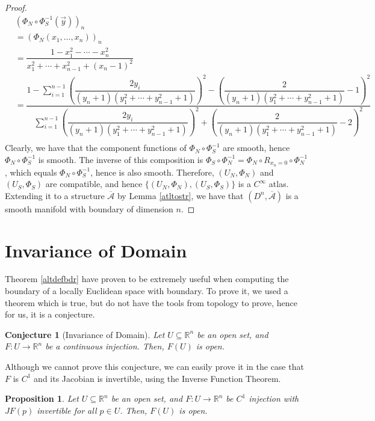 \documentclass{article}
\newcommand{\R}{\mathbb{R}}
\newcommand{\cl}[1]{\overline{#1}}
\newcommand{\atl}[1]{\mathcal{#1}}
\newcommand{\str}[1]{\cl{\atl{#1}}}
\theoremstyle{plain} %
\numberwithin{thm}{section} %
\newtheorem{prop}[thm]{Proposition}
\newtheorem{conj}[thm]{Conjecture}
\theoremstyle{definition} %
\begin{document}
\begin{proof}
\begin{align*}
    &(\Phi_N \circ \Phi_S^{-1}(\vec{y}))_n \\
    &= (\Phi_N(x_1, \dots, x_n))_n \\
    &= \dfrac{1 - x_1^2 - \cdots - x_n^2}{x_1^2 + \cdots + x_{n - 1}^2 + (x_n - 1)^2} \\
    &= \dfrac{1 - \displaystyle\sum_{i = 1}^{n - 1}\left(\dfrac{2y_i}{(y_n + 1)(y_1^2 + \cdots + y_{n - 1}^2 + 1)}\right)^2 - \left(\dfrac{2}{(y_n + 1)(y_1^2 + \cdots + y_{n - 1}^2 + 1)} - 1\right)^2}{\displaystyle\sum_{i = 1}^{n - 1}\left(\dfrac{2y_i}{(y_n + 1)(y_1^2 + \cdots + y_{n - 1}^2 + 1)}\right)^2 + \left(\dfrac{2}{(y_n + 1)(y_1^2 + \cdots + y_{n - 1}^2 + 1)} - 2\right)^2} \\
\end{align*}
Clearly, we have that the component functions of $\Phi_N \circ \Phi_S^{-1}$ are smooth, hence $\Phi_N \circ \Phi_S^{-1}$ is smooth. The inverse of this composition is $\Phi_S \circ \Phi_N^{-1} = \Phi_N \circ R_{x_n = 0} \circ \Phi_N^{-1}$, which equals $\Phi_N \circ \Phi_S^{-1}$, hence is also smooth. Therefore, $(U_N, \Phi_N)$ and $(U_S, \Phi_S)$ are compatible, and hence $\{(U_N, \Phi_N), (U_S, \Phi_S)\}$ is a $C^\infty$ atlas. Extending it to a structure $\str{A}$ by Lemma \ref{atltostr}, we have that $(D^n, \str{A})$ is a smooth manifold with boundary of dimension $n$.
\end{proof}

\appendix

\section{Invariance of Domain}

Theorem \ref{altdefbdr} have proven to be extremely useful when computing the boundary of a locally Euclidean space with boundary. To prove it, we used a theorem which is true, but do not have the tools from topology to prove, hence for us, it is a conjecture.

\begin{conj}[Invariance of Domain]
    \label{invdom}
    Let $U \subseteq \R^n$ be an open set, and $F: U \to \R^n$ be a continuous injection. Then, $F(U)$ is open.
\end{conj}

Although we cannot prove this conjecture, we can easily prove it in the case that $F$ is $C^1$ and its Jacobian is invertible, using the Inverse Function Theorem.

\begin{prop}
    Let $U \subseteq \R^n$ be an open set, and $F: U \to \R^n$ be $C^1$ injection with $JF(p)$ invertible for all $p \in U$. Then, $F(U)$ is open.
\end{prop}
\end{document}

